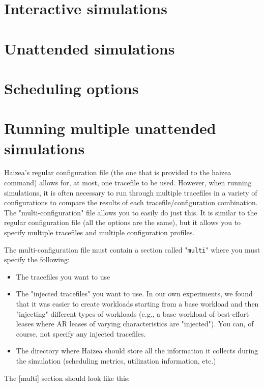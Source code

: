
\section{Interactive simulations}

\section{Unattended simulations}

\section{Scheduling options}

\section{Running multiple unattended simulations}

Haizea's regular configuration file (the one that is provided to the haizea command) allows for, at most, one tracefile to be used. However, when running simulations, it is often necessary to run through multiple tracefiles in a variety of configurations to compare the results of each tracefile/configuration combination. The "multi-configuration" file allows you to easily do just this. It is similar to the regular configuration file (all the options are the same), but it allows you to specify multiple tracefiles and multiple configuration profiles.

The multi-configuration file must contain a section called "\texttt{multi}" where you must specify the following:

\begin{itemize}
\item The tracefiles you want to use
\item The "injected tracefiles" you want to use. In our own experiments, we found that it was easier to create workloads starting from a base workload and then "injecting" different types of workloads (e.g., a base workload of best-effort leases where AR leases of varying characteristics are "injected"). You can, of course, not specify any injected tracefiles.
\item The directory where Haizea should store all the information it collects during the simulation (scheduling metrics, utilization information, etc.)
\end{itemize}

The [multi] section should look like this:


